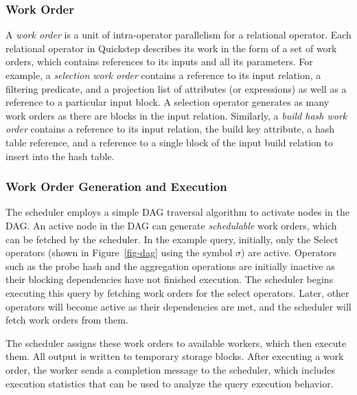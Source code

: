 \subsubsection{Work Order}

A \textit{work order} is a unit of intra-operator parallelism for a relational operator. Each relational operator in Quickstep describes its work in the form of a set of work orders, which contains references to its inputs and all its parameters.
For example, a \textit{selection work order} contains a reference to its input relation, a filtering predicate, and a projection list of attributes (or expressions) as well as a reference to a particular input block. A selection operator generates as many work orders as there are blocks in the input relation. Similarly, a \textit{build hash work order} contains a reference to its input relation, the build key attribute, a hash table reference, and a reference to a single block of the input build relation to insert into the hash table.

\subsubsection{Work Order Generation and Execution}

The scheduler employs a simple DAG traversal algorithm to activate nodes in the DAG.
An active node in the DAG can generate \textit{schedulable} work orders, which can be fetched by the scheduler.
In the example query, initially, only the Select operators (shown in Figure~\ref{fig-dag} using the symbol $\sigma$) are active. Operators such as the probe hash and the aggregation operations are initially inactive as their blocking dependencies have not finished execution.
The scheduler begins executing this query by fetching work orders for the select operators. Later, other operators will become active as their dependencies are met, and the  scheduler will fetch work orders from them.

The scheduler assigns these work orders to available workers, which then execute them. All output is written to temporary storage blocks. After executing a work order, the worker sends a completion message to the scheduler, which includes execution statistics that can be used %
to analyze the query execution behavior.

